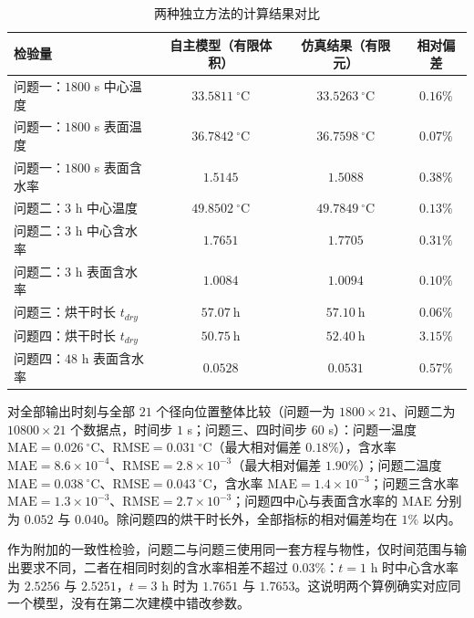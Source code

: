 \documentclass[12pt,a4paper]{article}
\begin{document}
\begin{table}[H]
\centering
\caption{两种独立方法的计算结果对比}
\label{tab:verify-comsol}
\begin{tabular}{lccc}
\toprule
检验量 & 自主模型（有限体积） & 仿真结果（有限元） & 相对偏差\\
\midrule
问题一：$1800$ s 中心温度 & $33.5811\ \mathrm{^\circ C}$ & $33.5263\ \mathrm{^\circ C}$ & $0.16\%$\\
问题一：$1800$ s 表面温度 & $36.7842\ \mathrm{^\circ C}$ & $36.7598\ \mathrm{^\circ C}$ & $0.07\%$\\
问题一：$1800$ s 表面含水率 & $1.5145$ & $1.5088$ & $0.38\%$\\
问题二：$3$ h 中心温度 & $49.8502\ \mathrm{^\circ C}$ & $49.7849\ \mathrm{^\circ C}$ & $0.13\%$\\
问题二：$3$ h 中心含水率 & $1.7651$ & $1.7705$ & $0.31\%$\\
问题二：$3$ h 表面含水率 & $1.0084$ & $1.0094$ & $0.10\%$\\
问题三：烘干时长 $t_{dry}$ & $57.07\ \mathrm{h}$ & $57.10\ \mathrm{h}$ & $0.06\%$\\
问题四：烘干时长 $t_{dry}$ & $50.75\ \mathrm{h}$ & $52.40\ \mathrm{h}$ & $3.15\%$\\
问题四：$48$ h 表面含水率 & $0.0528$ & $0.0531$ & $0.57\%$\\
\bottomrule
\end{tabular}
\end{table}

对全部输出时刻与全部 $21$ 个径向位置整体比较（问题一为 $1800\times21$、问题二为 $10800\times21$ 个数据点，时间步 $1$ s；问题三、四时间步 $60$ s）：问题一温度 $\mathrm{MAE}=0.026\ \mathrm{^\circ C}$、$\mathrm{RMSE}=0.031\ \mathrm{^\circ C}$（最大相对偏差 $0.18\%$），含水率 $\mathrm{MAE}=8.6\times10^{-4}$、$\mathrm{RMSE}=2.8\times10^{-3}$（最大相对偏差 $1.90\%$）；问题二温度 $\mathrm{MAE}=0.038\ \mathrm{^\circ C}$、$\mathrm{RMSE}=0.043\ \mathrm{^\circ C}$，含水率 $\mathrm{MAE}=1.4\times10^{-3}$；问题三含水率 $\mathrm{MAE}=1.3\times10^{-3}$、$\mathrm{RMSE}=2.7\times10^{-3}$；问题四中心与表面含水率的 $\mathrm{MAE}$ 分别为 $0.052$ 与 $0.040$。除问题四的烘干时长外，全部指标的相对偏差均在 $1\%$ 以内。

作为附加的一致性检验，问题二与问题三使用同一套方程与物性，仅时间范围与输出要求不同，二者在相同时刻的含水率相差不超过 $0.03\%$：$t=1$ h 时中心含水率为 $2.5256$ 与 $2.5251$，$t=3$ h 时为 $1.7651$ 与 $1.7653$。这说明两个算例确实对应同一个模型，没有在第二次建模中错改参数。
\end{document}

